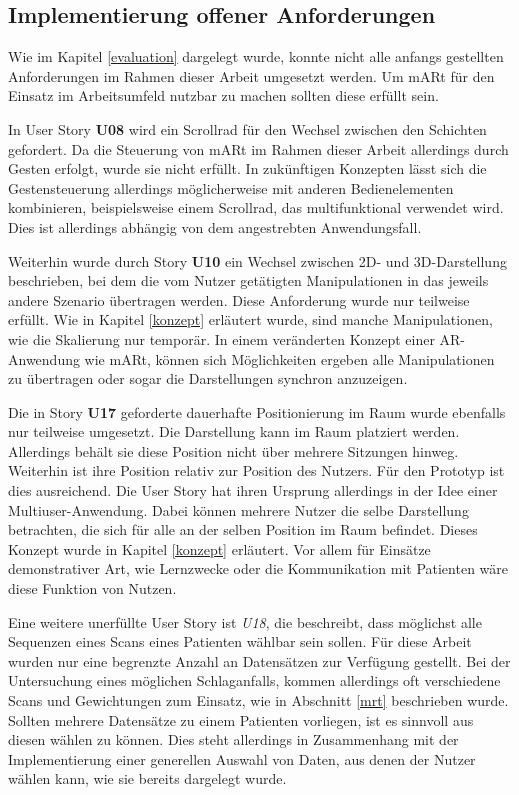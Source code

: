 \subsection{Implementierung offener  Anforderungen}

Wie im Kapitel \ref{evaluation} dargelegt wurde, konnte nicht alle anfangs gestellten Anforderungen im Rahmen dieser Arbeit umgesetzt werden. Um mARt für den Einsatz im Arbeitsumfeld nutzbar zu machen sollten diese erfüllt sein.

In User Story \textbf{U08} wird ein Scrollrad für den Wechsel zwischen den Schichten gefordert. Da die Steuerung von mARt im Rahmen dieser Arbeit allerdings durch Gesten erfolgt, wurde sie nicht erfüllt. In zukünftigen Konzepten lässt sich die Gestensteuerung allerdings möglicherweise mit anderen Bedienelementen kombinieren, beispielsweise einem Scrollrad, das multifunktional verwendet wird. Dies ist allerdings abhängig von dem angestrebten Anwendungsfall.

Weiterhin wurde durch Story \textbf{U10} ein Wechsel zwischen 2D- und 3D-Darstellung beschrieben, bei dem die vom Nutzer getätigten Manipulationen in das jeweils andere Szenario übertragen werden. Diese Anforderung wurde nur teilweise erfüllt. Wie in Kapitel \ref{konzept} erläutert wurde, sind manche Manipulationen, wie die Skalierung nur temporär. In einem veränderten Konzept einer AR-Anwendung wie mARt, können sich Möglichkeiten ergeben alle Manipulationen zu übertragen oder sogar die Darstellungen synchron anzuzeigen.

Die in Story \textbf{U17} geforderte dauerhafte Positionierung im Raum wurde ebenfalls nur teilweise umgesetzt. Die Darstellung kann im Raum platziert werden. Allerdings behält sie diese Position nicht über mehrere Sitzungen hinweg. 
Weiterhin ist ihre Position relativ zur Position des Nutzers. Für den Prototyp ist dies ausreichend. Die User Story hat ihren Ursprung allerdings in der Idee einer Multiuser-Anwendung. Dabei können mehrere Nutzer die selbe Darstellung betrachten, die sich für alle an der selben Position im Raum befindet. Dieses Konzept wurde in Kapitel \ref{konzept} erläutert. Vor allem für Einsätze demonstrativer Art, wie Lernzwecke oder die Kommunikation mit Patienten wäre diese Funktion von Nutzen.

Eine weitere unerfüllte User Story ist \textit{U18}, die beschreibt, dass möglichst alle Sequenzen eines Scans eines Patienten wählbar sein sollen. Für diese Arbeit wurden nur eine begrenzte Anzahl an Datensätzen zur Verfügung gestellt. Bei der Untersuchung eines möglichen Schlaganfalls, kommen allerdings oft verschiedene Scans und Gewichtungen zum Einsatz, wie in Abschnitt \ref{mrt} beschrieben wurde. Sollten mehrere Datensätze zu einem Patienten vorliegen, ist es sinnvoll aus diesen wählen zu können. Dies steht allerdings in Zusammenhang mit der Implementierung einer generellen Auswahl von Daten, aus denen der Nutzer wählen kann, wie sie bereits dargelegt wurde.

